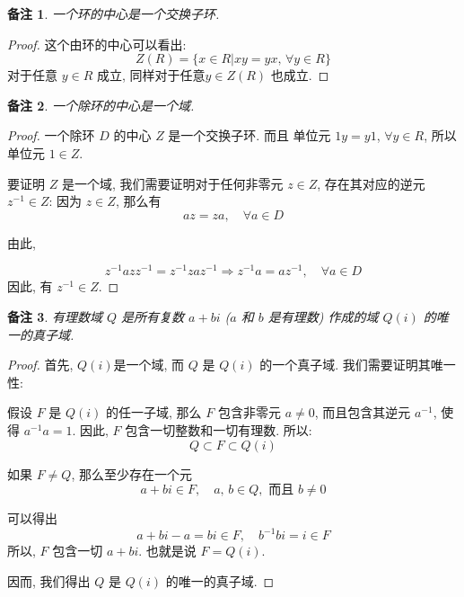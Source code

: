 \documentclass[utf8]{ctexbook}
\newtheorem{memo}{备注}[section]
\begin{document}
\begin{memo}
一个环的中心是一个交换子环.
\end{memo}


\begin{proof}
这个由环的中心可以看出:
\begin{equation}
Z(R) = \{ x \in R | xy = yx, \, \forall y \in R \}
\end{equation}
对于任意 $y \in R$ 成立, 同样对于任意$y \in Z(R)$ 也成立.
\end{proof}


\begin{memo}
一个除环的中心是一个域.
\end{memo}

\begin{proof}
一个除环 $D$ 的中心 $Z$ 是一个交换子环. 而且 单位元 $1 y = y 1$, $\forall y \in R$, 所以 单位元 $1 \in Z$.

要证明 $Z$ 是一个域, 我们需要证明对于任何非零元 $z \in Z$, 存在其对应的逆元 $z^{-1} \in Z$: 因为 $z \in Z$, 那么有
\begin{equation}
az = za, \quad \forall a \in D
\end{equation}

由此,

\begin{equation}
z^{-1} az z^{-1} = z^{-1} za z^{-1}  \Rightarrow z^{-1} a = a  z^{-1} , \quad \forall a \in D
\end{equation}
因此, 有 $z^{-1} \in Z$.

\end{proof}

\begin{memo}
有理数域 $Q$ 是所有复数 $a + bi$ ($a$ 和 $b$ 是有理数) 作成的域 $Q(i)$ 的唯一的真子域.
\end{memo}

\begin{proof}
首先, $Q(i)$是一个域, 而 $Q$ 是 $Q(i)$ 的一个真子域. 我们需要证明其唯一性:

假设 $F$ 是 $Q(i)$ 的任一子域, 那么 $F$ 包含非零元 $a \neq 0$, 而且包含其逆元 $a^{-1}$, 使得 $a^{-1} a = 1$. 因此, $F$ 包含一切整数和一切有理数. 所以:
\begin{equation}
Q \subset F \subset Q(i)
\end{equation}

如果 $F \neq Q$, 那么至少存在一个元
\begin{equation}
a + bi \in F, \quad a, \, b \in Q, \mbox{  而且  }  b \neq 0
\end{equation}

可以得出
\begin{equation}
a + bi - a  = bi \in F, \quad b^{-1} b i = i \in F
\end{equation}
所以, $F$ 包含一切 $a+ bi$. 也就是说 $F = Q(i)$.

因而, 我们得出 $Q$ 是 $Q(i)$ 的唯一的真子域.

\end{proof}
\end{document}
